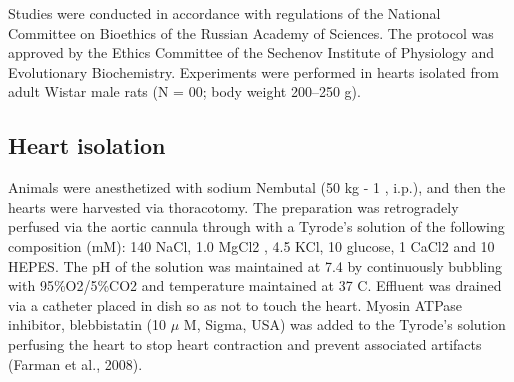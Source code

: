 \documentclass[a4paper,12pt]{article}
\begin{document}
Studies were conducted in accordance with regulations of the National Committee on Bioethics of the Russian Academy of Sciences.
The protocol was approved by the Ethics Committee of the Sechenov Institute of Physiology and Evolutionary Biochemistry.
Experiments were performed in hearts isolated from adult Wistar male rats (N = 00; body weight 200–250 g).

\subsection{Heart isolation}
Animals were anesthetized with sodium Nembutal (50 kg - 1 , i.p.), and then the hearts were harvested via thoracotomy.
The preparation was retrogradely perfused via the aortic cannula through with a Tyrode’s solution of the following composition (mM): 140 NaCl, 1.0 MgCl2 , 4.5 KCl, 10 glucose, 1 CaCl2 and 10 HEPES.
The pH of the solution was maintained at 7.4 by continuously bubbling with 95\%O2/5\%CO2 and temperature maintained at 37 C.
Effluent was drained via a catheter placed in dish so as not to touch the heart. Myosin ATPase inhibitor, blebbistatin (10 $\mu$ M, Sigma, USA) was added to the Tyrode’s solution perfusing the heart to stop heart contraction and prevent associated artifacts (Farman et al., 2008).
\end{document}
